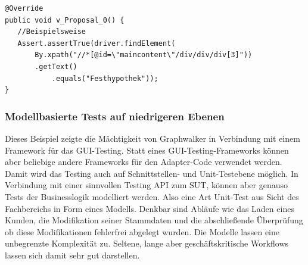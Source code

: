 \begin{lstlisting}[caption={Eine Assertion in Selenium auf einem Graphwalker Knoten}, label=lst:SeleniumImexAssertion, float]
@Override
public void v_Proposal_0() {
   //Beispielsweise
   Assert.assertTrue(driver.findElement(
	   By.xpath("//*[@id=\"maincontent\"/div/div/div[3]"))
	   .getText()
           .equals("Festhypothek"));
}
\end{lstlisting}

\subsubsection{Modellbasierte Tests auf niedrigeren Ebenen} Dieses Beispiel zeigte die Mächtigkeit von Graphwalker in Verbindung mit einem Framework für das GUI-Testing. Statt eines GUI-Testing-Frameworks können aber beliebige andere Frameworks für den Adapter-Code verwendet werden. Damit wird das Testing auch auf Schnittstellen- und Unit-Testebene möglich. In Verbindung mit einer sinnvollen Testing API zum SUT, können aber genauso Tests der Businesslogik modelliert werden. Also eine Art Unit-Test aus Sicht des Fachbereichs in Form eines Modells. Denkbar sind Abläufe wie das Laden eines Kunden, die Modifikation seiner Stammdaten und die abschließende Überprüfung ob diese Modifikationen fehlerfrei abgelegt wurden. Die Modelle lassen eine unbegrenzte Komplexität zu. Seltene, lange aber geschäftskritische Workflows lassen sich damit sehr gut darstellen.

